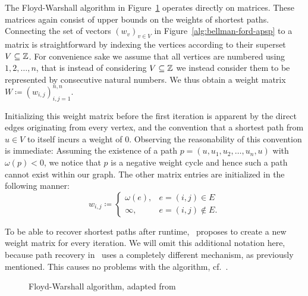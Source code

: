 The Floyd-Warshall algorithm in Figure~\ref{alg:floyd-warshall} operates directly on matrices.
These matrices again consist of upper bounds on the weights of shortest paths.
Connecting the set of vectors ${(w_v)}_{v \in V}$ in Figure~\ref{alg:bellman-ford-apsp} to a matrix is straightforward by indexing the vertices according to their superset $V \subseteq \mathbb{Z}$.
For convenience sake we assume that all vertices are numbered using $1, 2, \dots, n$, that is instead of considering $V \subseteq \mathbb{Z}$ we instead consider them to be represented by consecutive natural numbers.
We thus obtain a weight matrix $W \coloneqq {(w_{i, j})}_{i, j = 1}^{n, n}$.

Initializing this weight matrix before the first iteration is apparent by the direct edges originating from every vertex, and the convention that a shortest path from $u \in V$ to itself incurs a weight of $0$.
Observing the reasonability of this convention is immediate: Assuming the existence of a path $p = (u, u_1, u_2, \dots, u_n, u)$ with $\omega(p) < 0$, we notice that $p$ is a negative weight cycle and hence such a path cannot exist within our graph.
The other matrix entries are initialized in the following manner:
\[
    w_{i, j} \coloneqq \begin{cases}
        \omega(e), & e = (i, j) \in E \\
        \infty, & e = (i, j) \not\in E.
    \end{cases}
\]

To be able to recover shortest paths after runtime,\ \cite[Chapter~25]{Cormen2001} proposes to create a new weight matrix for every iteration.
We will omit this additional notation here, because path recovery in~\cite{Chan2007} uses a completely different mechanism, as previously mentioned.
This causes no problems with the algorithm, cf.~\cite[Exercise~25.4-5]{Cormen2001}.

\begin{figure}[ht]
    \centering
    \begin{minipage}{.6\textwidth}
        \begin{algorithm}[H]
        \end{algorithm}
    \end{minipage}
    \caption{Floyd-Warshall algorithm, adapted from~\cite[Chapter~25]{Cormen2001}}\label{alg:floyd-warshall}
\end{figure}

